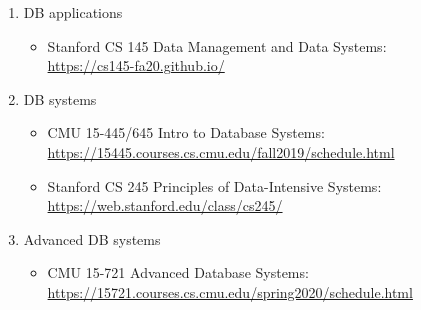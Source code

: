 \documentclass{article}
\begin{document}
\begin{enumerate}
\begin{enumerate}
        \item DB applications
        \begin{itemize}
            \item Stanford CS 145 Data Management and Data Systems:\\
            \href{https://cs145-fa20.github.io/}{https://cs145-fa20.github.io/}
        \end{itemize}
        \item DB systems
        \begin{itemize}
            \item CMU 15-445/645 Intro to Database Systems:\\
            \href{https://15445.courses.cs.cmu.edu/fall2019/schedule.html}{https://15445.courses.cs.cmu.edu/fall2019/schedule.html}
            \item Stanford CS 245 Principles of Data-Intensive Systems:\\
            \href{https://web.stanford.edu/class/cs245/}{https://web.stanford.edu/class/cs245/}
        \end{itemize}
            \item Advanced DB systems
            \begin{itemize}
                \item CMU 15-721 Advanced Database Systems:\\
                \href{https://15721.courses.cs.cmu.edu/spring2020/schedule.html}{https://15721.courses.cs.cmu.edu/spring2020/schedule.html}        
            \end{itemize}
    \end{enumerate}


\end{enumerate}
\end{document}
